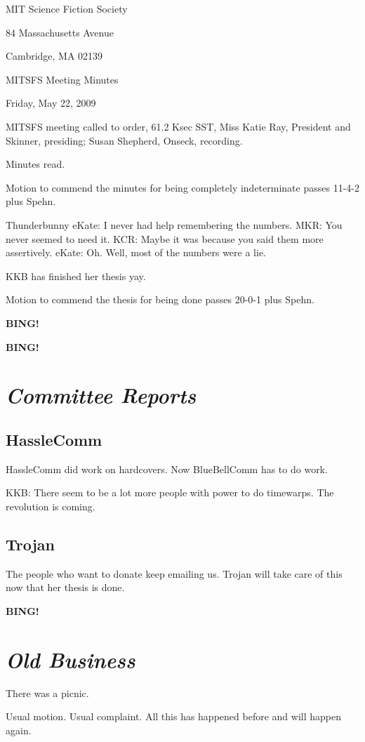 \documentclass[10pt]{article}
\newcommand{\bing}{{\bf BING!} }
\newcommand{\goto}[1]{\bing \vskip 12pt \section*{{\em{#1}}}}
\newcommand{\ps}{ plus Spehn\xspace}
\begin{document}
\begin{center}

MIT Science Fiction Society

84 Massachusetts Avenue

Cambridge, MA 02139

\vspace{12pt}

MITSFS Meeting Minutes

Friday, May 22, 2009

\end{center}

\vspace{18pt}

\setlength{\parskip}{6pt}

\noindent
MITSFS meeting called to order, 61.2 Ksec SST,
Miss Katie Ray, President and Skinner, presiding; Susan Shepherd, Onseck, recording.

Minutes read.

Motion to commend the minutes for being completely indeterminate passes 11-4-2\ps.

Thunderbunny eKate: I never had help remembering the numbers.
MKR: You never seemed to need it.
KCR: Maybe it was because you said them more assertively.
eKate: Oh. Well, most of the numbers were a lie.

KKB has finished her thesis yay.

Motion to commend the thesis for being done passes 20-0-1\ps.

\bing

\goto{Committee Reports}

\subsection*{HassleComm}
HassleComm did work on hardcovers. Now BlueBellComm has to do work.

KKB: There seem to be a lot more people with power to do timewarps. The revolution is coming.

\subsection*{Trojan}
The people who want to donate keep emailing us. Trojan will take care of this now that her thesis is done.

\goto{Old Business}

There was a picnic.

Usual motion. Usual complaint. All this has happened before and will happen again.
\end{document}
